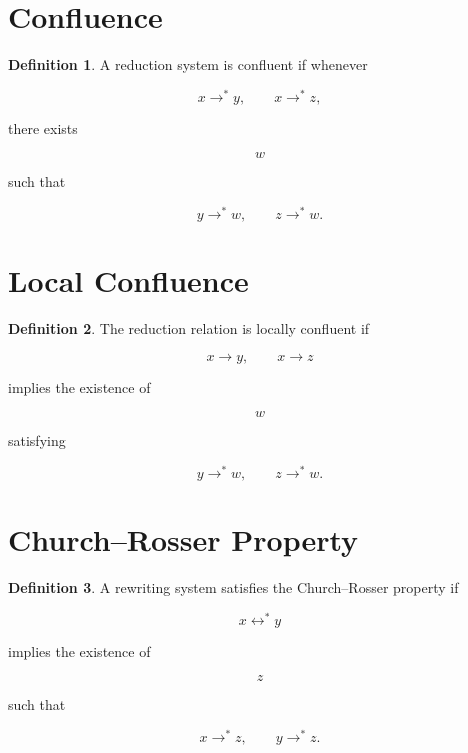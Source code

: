 \documentclass[11pt]{book}
\numberwithin{equation}{chapter}
\theoremstyle{definition}
\newtheorem{definition}{Definition}[chapter]
\theoremstyle{plain}
\begin{document}

\section{Confluence}

\begin{definition}

A reduction system is confluent if whenever

\[
x
\rightarrow^{*}
y,
\qquad
x
\rightarrow^{*}
z,
\]

there exists

\[
w
\]

such that

\[
y
\rightarrow^{*}
w,
\qquad
z
\rightarrow^{*}
w.
\]

\end{definition}


\section{Local Confluence}

\begin{definition}

The reduction relation is locally confluent if

\[
x
\rightarrow
y,
\qquad
x
\rightarrow
z
\]

implies the existence of

\[
w
\]

satisfying

\[
y
\rightarrow^{*}
w,
\qquad
z
\rightarrow^{*}
w.
\]

\end{definition}


\section{Church--Rosser Property}

\begin{definition}

A rewriting system satisfies the Church--Rosser property if

\[
x
\leftrightarrow^{*}
y
\]

implies the existence of

\[
z
\]

such that

\[
x
\rightarrow^{*}
z,
\qquad
y
\rightarrow^{*}
z.
\]

\end{definition}
\end{document}
